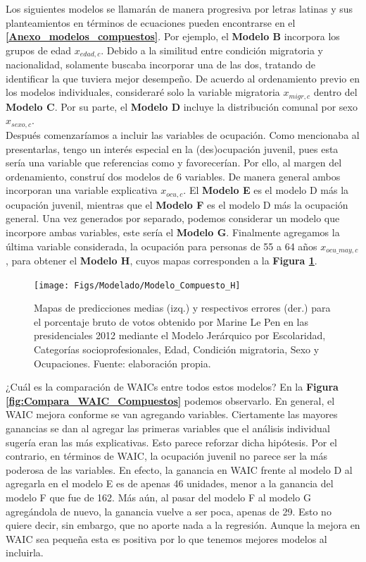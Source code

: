 Los siguientes modelos se llamarán de manera progresiva por letras latinas y sus planteamientos en términos de ecuaciones pueden encontrarse en el \textbf{\autoref{Anexo_modelos_compuestos}}. Por ejemplo, el \textbf{Modelo B} incorpora los grupos de edad $x_{edad,c}$. Debido a la similitud entre condición migratoria y nacionalidad, solamente buscaba incorporar una de las dos, tratando de identificar la que tuviera mejor desempeño. De acuerdo al ordenamiento previo en los modelos individuales, consideraré solo la variable migratoria $x_{migr,c}$ dentro del \textbf{Modelo C}. Por su parte, el \textbf{Modelo D} incluye la distribución comunal por sexo $x_{sexo,c}$.\\

Después comenzaríamos a incluir las variables de ocupación. Como mencionaba al presentarlas, tengo un interés especial en la (des)ocupación juvenil, pues esta sería una variable que referencias como \textcite{LeBras16} y \textcite{Perrineau07} favorecerían. Por ello, al margen del ordenamiento, construí dos modelos de 6 variables. De manera general ambos incorporan una variable explicativa $x_{ocu,c}$. El \textbf{Modelo E} es el modelo D más la ocupación juvenil, mientras que el \textbf{Modelo F} es el modelo D más la ocupación general. Una vez generados por separado, podemos considerar un modelo que incorpore ambas variables, este sería el \textbf{Modelo G}. Finalmente agregamos la última variable considerada, la ocupación para personas de 55 a 64 años $x_{ocu\_may,c}$, para obtener el \textbf{Modelo H}, cuyos mapas corresponden a la \textbf{Figura \ref{fig:Modelo_Compuesto_H}}.\\

\begin{figure}[h]
	\centering
	\texttt{[image: Figs/Modelado/Modelo\_Compuesto\_H]}
	\caption{Mapas de predicciones medias (izq.) y respectivos errores (der.) para el porcentaje bruto de votos obtenido por Marine Le Pen en las presidenciales 2012 mediante el Modelo Jerárquico por Escolaridad, Categorías socioprofesionales, Edad, Condición migratoria, Sexo y Ocupaciones. Fuente: elaboración propia.}
	\label{fig:Modelo_Compuesto_H}
\end{figure}

¿Cuál es la comparación de WAICs entre todos estos modelos? En la \textbf{Figura \ref{fig:Compara_WAIC_Compuestos}} podemos observarlo. En general, el WAIC mejora conforme se van agregando variables. Ciertamente las mayores ganancias se dan al agregar las primeras variables que el análisis individual sugería eran las más explicativas. Esto parece reforzar dicha hipótesis. Por el contrario, en términos de WAIC, la ocupación juvenil no parece ser la más poderosa de las variables. En efecto, la ganancia en WAIC frente al modelo D al agregarla en el modelo E es de apenas 46 unidades, menor a la ganancia del modelo F que fue de 162. Más aún, al pasar del modelo F al modelo G agregándola de nuevo, la ganancia vuelve a ser poca, apenas de 29. Esto no quiere decir, sin embargo, que no aporte nada a la regresión. Aunque la mejora en WAIC sea pequeña esta es positiva por lo que tenemos mejores modelos al incluirla.\\

